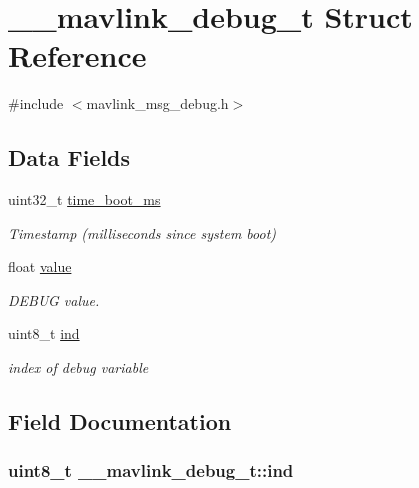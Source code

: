 \hypertarget{struct____mavlink__debug__t}{\section{\+\_\+\+\_\+mavlink\+\_\+debug\+\_\+t Struct Reference}
\label{struct____mavlink__debug__t}
}


{\ttfamily \#include $<$mavlink\+\_\+msg\+\_\+debug.\+h$>$}

\subsection*{Data Fields}
\begin{DoxyCompactItemize}
\item 
uint32\+\_\+t \hyperlink{struct____mavlink__debug__t_afc1d1057d77ded488ac7b5034411604c}{time\+\_\+boot\+\_\+ms}
\begin{DoxyCompactList}\small\item\em Timestamp (milliseconds since system boot) \end{DoxyCompactList}\item 
float \hyperlink{struct____mavlink__debug__t_aef9d0e91db46dff84494856146dcbcbe}{value}
\begin{DoxyCompactList}\small\item\em D\+E\+B\+U\+G value. \end{DoxyCompactList}\item 
uint8\+\_\+t \hyperlink{struct____mavlink__debug__t_a540aecd3c98dd395f80edd92acab7c3d}{ind}
\begin{DoxyCompactList}\small\item\em index of debug variable \end{DoxyCompactList}\end{DoxyCompactItemize}


\subsection{Field Documentation}
\hypertarget{struct____mavlink__debug__t_a540aecd3c98dd395f80edd92acab7c3d}{
\subsubsection[{ind}]{\setlength{\rightskip}{0pt plus 5cm}uint8\+\_\+t \+\_\+\+\_\+mavlink\+\_\+debug\+\_\+t\+::ind}}\label{struct____mavlink__debug__t_a540aecd3c98dd395f80edd92acab7c3d}


